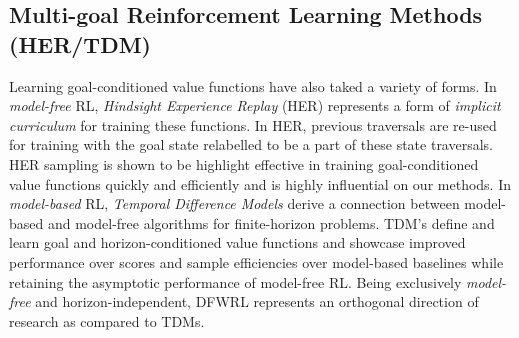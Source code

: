 \subsection{Multi-goal Reinforcement Learning Methods (HER/TDM)}
Learning goal-conditioned value functions have also taked a variety of
forms. In \emph{model-free} RL, \emph{Hindsight Experience Replay} (HER)
\citep{andrychowicz2017hindsight} represents a form of \emph{implicit
curriculum} for training these functions. In HER, previous traversals
are re-used for training with the goal state relabelled to be a part of
these state traversals. HER sampling is shown to be highlight effective
in training goal-conditioned value functions quickly and efficiently and
is highly influential on our methods. In
\emph{model-based} RL, \emph{Temporal Difference Models}
\citep{pong2018temporal} derive a
connection between model-based and model-free algorithms for
finite-horizon problems. TDM's define and learn goal and
horizon-conditioned value functions and showcase improved performance
over scores and sample efficiencies over model-based baselines while
retaining the asymptotic performance of model-free RL. Being exclusively
\emph{model-free} and horizon-independent, DFWRL represents an
orthogonal direction of research as compared to TDMs. 


